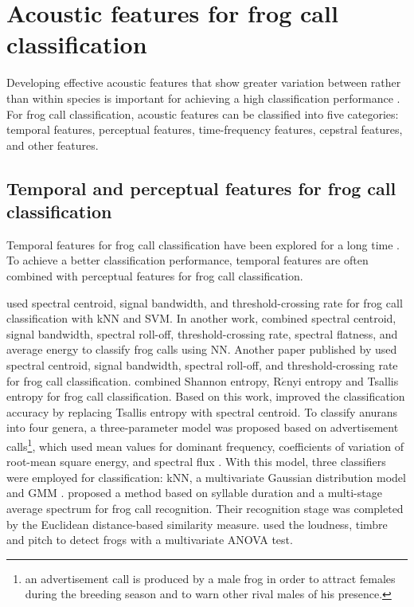 \section{Acoustic features for frog call classification}
\label{features}
Developing effective acoustic features that show greater variation between rather than within species is important for achieving a high classification performance \citep{Fox20081187}. For frog call classification, acoustic features can be classified into five categories: temporal features, perceptual features, time-frequency features, cepstral features, and other features. 

\subsection{Temporal and perceptual features for frog call classification}

Temporal features for frog call classification have been explored for a long time \citep{huang2008realization, huang2009frog, dayou2011classification, chen2012automatic, camacho2013automatic, Huang20141}. To achieve a better classification performance, temporal features are often combined with perceptual features for frog call classification.
 
\cite{huang2009frog} used spectral centroid, signal bandwidth, and threshold-crossing rate for frog call classification with kNN and SVM. In another work, \cite{Huang20141} combined spectral centroid, signal bandwidth, spectral roll-off, threshold-crossing rate, spectral flatness, and average energy to classify frog calls using NN. Another paper published by  \citep{huang2008realization} used spectral centroid, signal bandwidth, spectral roll-off, and threshold-crossing rate for frog call classification. 
\cite{dayou2011classification} combined Shannon entropy, R$\acute{e}$nyi entropy and Tsallis entropy for frog call classification. Based on this work, \cite{han2011acoustic} improved the classification accuracy by replacing Tsallis entropy with spectral centroid.
To classify anurans into four genera, a three-parameter model was proposed based on advertisement calls\footnote[1]{an advertisement call is produced by a male frog in order to attract females during the breeding season and to warn other rival males of his presence.}, which used mean values for dominant frequency, coefficients of variation of root-mean square energy, and spectral flux \citep{Gingras2013}. With this model, three classifiers  were employed for classification: kNN, a multivariate Gaussian distribution model and GMM \citep{Gingras2013}.
\cite{chen2012automatic} proposed a method based on syllable duration and a multi-stage average spectrum for frog call recognition. Their recognition stage was completed by the Euclidean distance-based similarity measure. \cite{camacho2013automatic} used the loudness, timbre and pitch to detect frogs with a multivariate ANOVA test.






